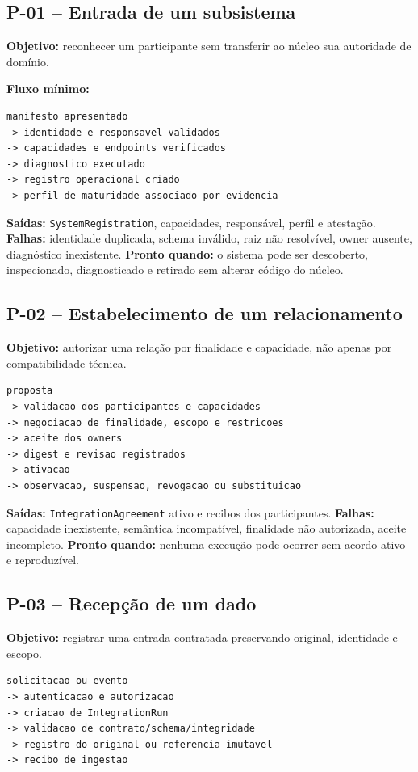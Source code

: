 \documentclass[11pt,a4paper,oneside]{article}
\begin{document}
\subsection{P-01 -- Entrada de um subsistema}
\textbf{Objetivo:} reconhecer um participante sem transferir ao núcleo sua autoridade de domínio.

\textbf{Fluxo mínimo:}
\begin{lstlisting}
manifesto apresentado
-> identidade e responsavel validados
-> capacidades e endpoints verificados
-> diagnostico executado
-> registro operacional criado
-> perfil de maturidade associado por evidencia
\end{lstlisting}

\textbf{Saídas:} \texttt{SystemRegistration}, capacidades, responsável, perfil e atestação.  
\textbf{Falhas:} identidade duplicada, schema inválido, raiz não resolvível, owner ausente, diagnóstico inexistente.  
\textbf{Pronto quando:} o sistema pode ser descoberto, inspecionado, diagnosticado e retirado sem alterar código do núcleo.

\subsection{P-02 -- Estabelecimento de um relacionamento}
\textbf{Objetivo:} autorizar uma relação por finalidade e capacidade, não apenas por compatibilidade técnica.

\begin{lstlisting}
proposta
-> validacao dos participantes e capacidades
-> negociacao de finalidade, escopo e restricoes
-> aceite dos owners
-> digest e revisao registrados
-> ativacao
-> observacao, suspensao, revogacao ou substituicao
\end{lstlisting}

\textbf{Saídas:} \texttt{IntegrationAgreement} ativo e recibos dos participantes.  
\textbf{Falhas:} capacidade inexistente, semântica incompatível, finalidade não autorizada, aceite incompleto.  
\textbf{Pronto quando:} nenhuma execução pode ocorrer sem acordo ativo e reproduzível.

\subsection{P-03 -- Recepção de um dado}
\textbf{Objetivo:} registrar uma entrada contratada preservando original, identidade e escopo.

\begin{lstlisting}
solicitacao ou evento
-> autenticacao e autorizacao
-> criacao de IntegrationRun
-> validacao de contrato/schema/integridade
-> registro do original ou referencia imutavel
-> recibo de ingestao
\end{lstlisting}
\end{document}
